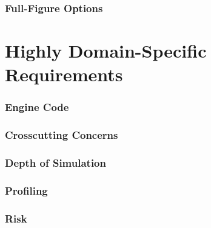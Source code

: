     \subsubsection*{Full-Figure Options}

  \section*{Highly Domain-Specific Requirements}

    \subsubsection*{Engine Code}

    \subsubsection*{Crosscutting Concerns}

    \subsubsection*{Depth of Simulation}

    \subsubsection*{Profiling}

    \subsubsection*{Risk}